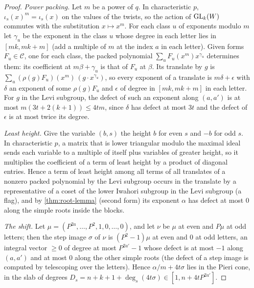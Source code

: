 \begin{proof}
\emph{Power packing.} Let $m$ be a power of $q$. In characteristic $p$, $\iota_s(x)^m=\iota_s(x)$ on the values of the twists, so the action of $\operatorname{GL}_k(W)$ commutes with the substitution $x\mapsto x^m$. For each class $u$ of exponents modulo $m$ let $\gamma_u$ be the exponent in the class $u$ whose degree in each letter lies in $[mk,mk+m]$ (add a multiple of $m$ at the index $a$ in each letter). Given forms $F_u\in\mathcal C$, one for each
class, the packed polynomial $\sum_uF_u(x^m)x^{\gamma_u}$ determines them: its coefficient at $m\beta+\gamma_u$ is that of $F_u$ at $\beta$. Its translate by $g$ is $\sum_u(\rho(g)F_u)(x^m)\,(g\cdot x^{\gamma_u})$, so every exponent of a translate is $m\delta+\epsilon$ with $\delta$ an exponent of some $\rho(g)F_u$ and $\epsilon$ of degree in $[mk,mk+m]$ in each letter. For $g$ in the Levi subgroup, the defect of such an exponent along $(a,a')$ is at most
$m(3t+2(k+1))\le4tm$, since $\delta$ has defect at most $3t$ and the defect of $\epsilon$ is at most twice its degree.

\emph{Least height.} Give the variable $(b,s)$ the height $b$ for even $s$ and $-b$ for odd $s$. In characteristic $p$, a matrix that is lower triangular modulo the maximal ideal sends each variable to a multiple of itself plus variables of greater height, so it multiplies the coefficient of a term of least height by a product of diagonal entries. Hence a term of least height among all terms of all translates of a nonzero packed polynomial by the
Levi subgroup occurs in the translate by a representative of a coset of the lower Iwahori subgroup in the Levi subgroup (a flag), and by \cref{thm:root-lemma} (second form) its exponent $\alpha$ has defect at most $0$ along the simple roots inside the blocks.

\emph{The shift.} Let $\mu=(P^{2a},\dots,P^2,1,0,\dots,0)$, and let $\nu$ be $\mu$ at even and $P\mu$ at odd letters; then the step image $\sigma$ of $\nu$ is $(P^2-1)\mu$ at even and $0$ at odd letters, an integral vector $\ge0$ of degree at most $P^{2a'}-1$ whose defect is at most $-1$ along $(a,a')$ and at most $0$ along the other simple roots (the defect of a step image is computed by telescoping over the letters). Hence $\alpha/m+4t\sigma$
lies in the Pieri cone, in the slab of degrees $D_s=n+k+1+\deg_s(4t\sigma)\in[1,n+4tP^{2a'}]$.


\end{proof}

